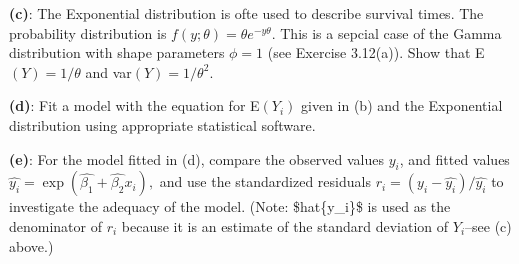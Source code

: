 \documentclass[]{article}
\begin{document}
\textbf{(c)}: The Exponential distribution is ofte used to describe
survival times. The probability distribution is
\(f(y; \theta) = \theta e^{-y\theta}\). This is a sepcial case of the
Gamma distribution with shape parameters \(\phi = 1\) (see Exercise
3.12(a)). Show that E\((Y) = 1/\theta\) and var\((Y) = 1/\theta^2\).

\textbf{(d)}: Fit a model with the equation for E\((Y_i)\) given in (b)
and the Exponential distribution using appropriate statistical software.

\textbf{(e)}: For the model fitted in (d), compare the observed values
\(y_i\), and fitted values
\(\hat{y_i} = \exp(\hat{\beta_1} + \hat{\beta_2}x_i),\) and use the
standardized residuals \(r_i = (y_i - \hat{y_i})/\hat{y_i}\) to
investigate the adequacy of the model. (Note: \$hat\{y\_i\}\$ is used as
the denominator of \(r_i\) because it is an estimate of the standard
deviation of \(Y_i\)--see (c) above.)
\end{document}
